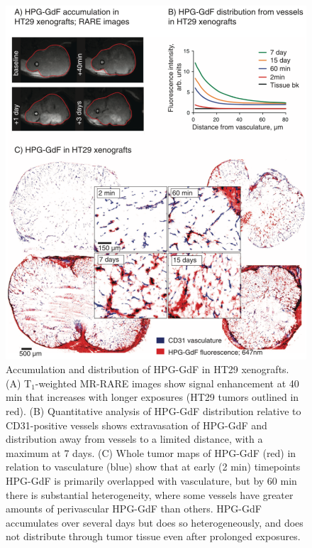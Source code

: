 \begin{figure}[htbp]   
 \begin{center}  
 \includegraphics[width=\textwidth]{hpg/hpg-paper1-images/hpg_fig3-hpgdistribution.png}
 \caption{Accumulation and distribution of HPG-GdF in HT29 xenografts. (A) T$_1$-weighted MR-RARE images show signal enhancement at 40 min that increases with longer exposures (HT29 tumors outlined in red). (B) Quantitative analysis of HPG-GdF distribution relative to CD31-positive vessels shows extravasation of HPG-GdF and distribution away from vessels to a limited distance, with a maximum at 7 days. (C) Whole tumor maps of HPG-GdF (red) in relation to vasculature (blue) show that at early (2 min) timepoints HPG-GdF is primarily overlapped with vasculature, but by 60 min there is substantial heterogeneity, where some vessels have greater amounts of perivascular HPG-GdF than others. HPG-GdF accumulates over several days but does so heterogeneously, and does not distribute through tumor tissue even after prolonged exposures.}  
 \label{hpgpaper1:fig3}  
 \end{center}
\end{figure}

